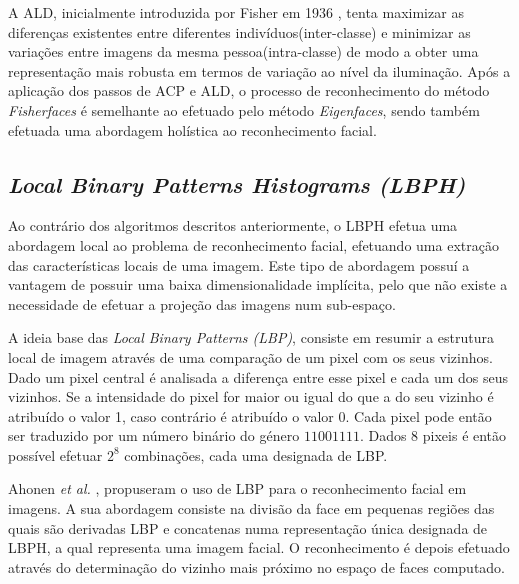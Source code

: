 A ALD, inicialmente introduzida por Fisher em 1936 \cite{FISHER1936}, tenta maximizar as diferenças existentes entre diferentes indivíduos(inter-classe) e minimizar as variações entre imagens da mesma pessoa(intra-classe) de modo a obter uma representação mais robusta em termos de variação ao nível da iluminação. Após a aplicação dos passos de ACP e ALD, o processo de reconhecimento do método \textit{Fisherfaces} é semelhante ao efetuado pelo método \textit{Eigenfaces}, sendo também efetuada uma abordagem holística ao reconhecimento facial.


\subsection{\textit{Local Binary Patterns Histograms (LBPH)}}
Ao contrário dos algoritmos descritos anteriormente, o LBPH efetua uma abordagem local ao problema de reconhecimento facial, efetuando uma extração das características locais de uma imagem. Este tipo de abordagem possuí a vantagem de possuir uma baixa dimensionalidade implícita, pelo que não existe a necessidade de efetuar a projeção das imagens num sub-espaço.

A ideia base das \textit{Local Binary Patterns (LBP)}, consiste em resumir a estrutura local de imagem através de uma comparação de um pixel com os seus vizinhos. Dado um pixel central é analisada a diferença entre esse pixel e cada um dos seus vizinhos. Se a intensidade do pixel for maior ou igual do que a do seu vizinho é atribuído o valor 1, caso contrário é atribuído o valor 0. Cada pixel pode então ser traduzido por um número binário do género $11001111$. Dados $8$ pixeis é então possível efetuar $2^8$ combinações, cada uma designada de LBP.

Ahonen \textit{et al.} \cite{ahonen2004face}, propuseram o uso de LBP para o reconhecimento facial em imagens. A sua abordagem consiste na divisão da face em pequenas regiões das quais são derivadas LBP e concatenas numa representação única designada de LBPH, a qual representa uma imagem facial. O reconhecimento é depois efetuado através do determinação do vizinho mais próximo no espaço de faces computado.
